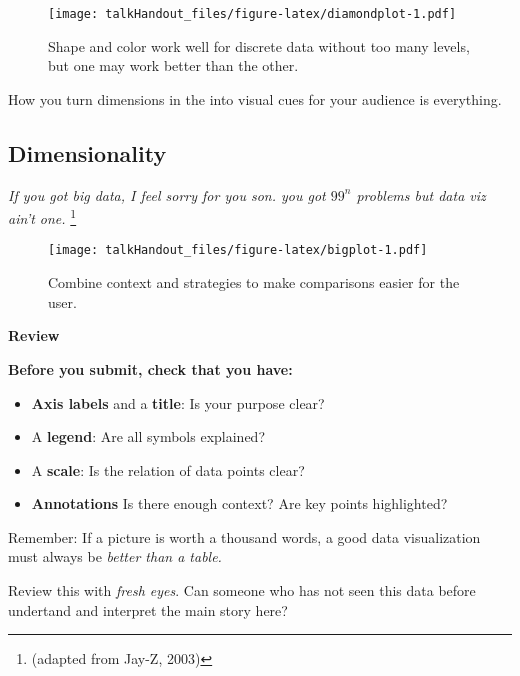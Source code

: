 \documentclass{tufte-handout}
\begin{document}
\begin{figure}
 \texttt{[image: talkHandout\_files/figure-latex/diamondplot-1.pdf]}
\caption{Shape and color work well for discrete data without too many levels, but one may work better than the other.}
\end{figure}

\noindent How you turn dimensions in the into visual cues for your
audience is everything.

\subsection{Dimensionality}\label{dimensionality}

\emph{If you got big data, I feel sorry for you son. you got $99^{n}$
problems but data viz ain't one.} \footnote{(adapted from Jay-Z, 2003)}

\begin{figure*}
 \texttt{[image: talkHandout\_files/figure-latex/bigplot-1.pdf]}
\caption{Combine context and strategies to make comparisons easier for the user.}
\end{figure*}

\textbf{Review}

\textbf{Before you submit, check that you have:}

\begin{itemize}
\itemsep1pt\parskip0pt
\item
  \textbf{Axis labels} and a \textbf{title}: Is your purpose clear?
\item
  A \textbf{legend}: Are all symbols explained?
\item
  A \textbf{scale}: Is the relation of data points clear?
\item
  \textbf{Annotations} Is there enough context? Are key points
  highlighted?
\end{itemize}

\noindent Remember: If a picture is worth a thousand words, a good data
visualization must always be \emph{better than a table.}

\noindent Review this with \emph{fresh eyes}. Can someone who has not
seen this data before undertand and interpret the main story here?
\end{document}
